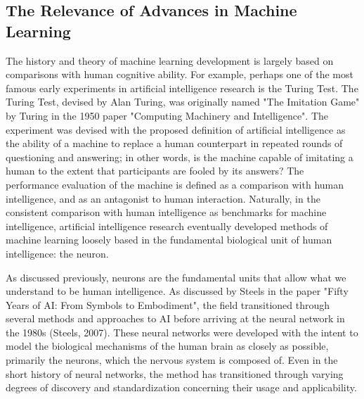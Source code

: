 \documentclass[11pt,titlepage]{article}
\begin{document}
\subsection{The Relevance of Advances in Machine Learning}
The history and theory of machine learning development is largely based on comparisons with human cognitive ability. For example, perhaps one of the most famous early experiments in artificial intelligence research is the Turing Test. The Turing Test, devised by Alan Turing, was originally named "The Imitation Game" by Turing in the 1950 paper "Computing Machinery and Intelligence". The experiment was devised with the proposed definition of artificial intelligence as the ability of a machine to replace a human counterpart in repeated rounds of questioning and answering; in other words, is the machine capable of imitating a human to the extent that participants are fooled by its answers? The performance evaluation of the machine is defined as a comparison with human intelligence, and as an antagonist to human interaction. Naturally, in the consistent comparison with human intelligence as benchmarks for machine intelligence, artificial intelligence research eventually developed methods of machine learning loosely based in the fundamental biological unit of human intelligence: the neuron.\par

As discussed previously, neurons are the fundamental units that allow what we understand to be human intelligence. As discussed by Steels in the paper "Fifty Years of AI: From Symbols to Embodiment", the field transitioned through several methods and approaches to AI before arriving at the neural network in the 1980s (Steels, 2007). These neural networks were developed with the intent to model the biological mechanisms of the human brain as closely as possible, primarily the neurons, which the nervous system is composed of. Even in the short history of neural networks, the method has transitioned through varying degrees of discovery and standardization concerning their usage and applicability.\par
\end{document}
